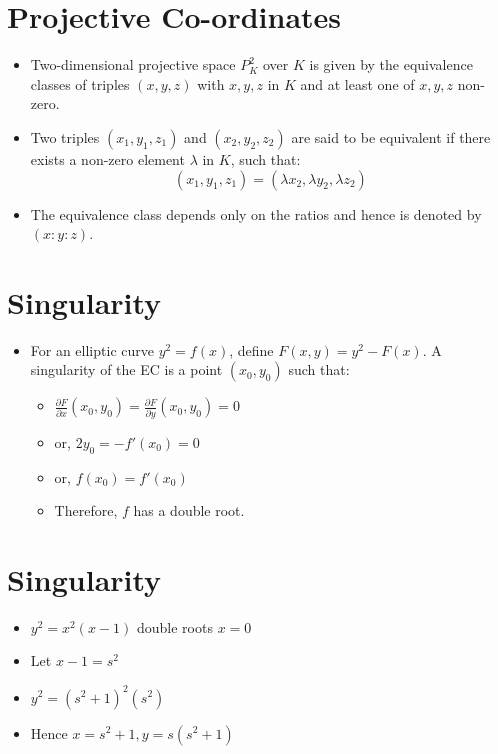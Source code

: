 \section*{Projective Co-ordinates}

\begin{itemize}
	\item Two-dimensional projective space \( P_K^2 \) over \( K \) is given by the equivalence classes of triples \( (x,y,z) \) with \( x, y, z \) in \( K \) and at least one of \( x, y, z \) non-zero.
	\item Two triples \( (x_1,y_1,z_1) \) and \( (x_2,y_2,z_2) \) are said to be equivalent if there exists a non-zero element \( \lambda \) in \( K \), such that:
	\[ (x_1,y_1,z_1) = (\lambda x_2, \lambda y_2, \lambda z_2) \]
	\item The equivalence class depends only on the ratios and hence is denoted by \( (x : y : z) \).
\end{itemize}

\section*{Singularity}

\begin{itemize}
	\item For an elliptic curve \( y^2 = f(x) \), define \( F(x,y) = y^2 - F(x) \). A singularity of the EC is a point \( (x_0,y_0) \) such that:
	\begin{itemize}
		\item \( \frac{\partial F}{\partial x}(x_0,y_0) = \frac{\partial F}{\partial y}(x_0,y_0) = 0 \)
		\item or, \( 2y_0 = -f'(x_0) = 0 \)
		\item or, \( f(x_0) = f'(x_0) \)
		\item Therefore, \( f \) has a double root.
	\end{itemize}
\end{itemize}

\section*{Singularity}

\begin{itemize}
	\item \( y^2 = x^2(x-1) \) double roots \( x=0 \)
	\item Let \( x-1=s^2 \)
	\item \( y^2 = (s^2+1)^2(s^2) \)
	\item Hence \( x=s^2+1, y=s(s^2+1) \)
\end{itemize}

